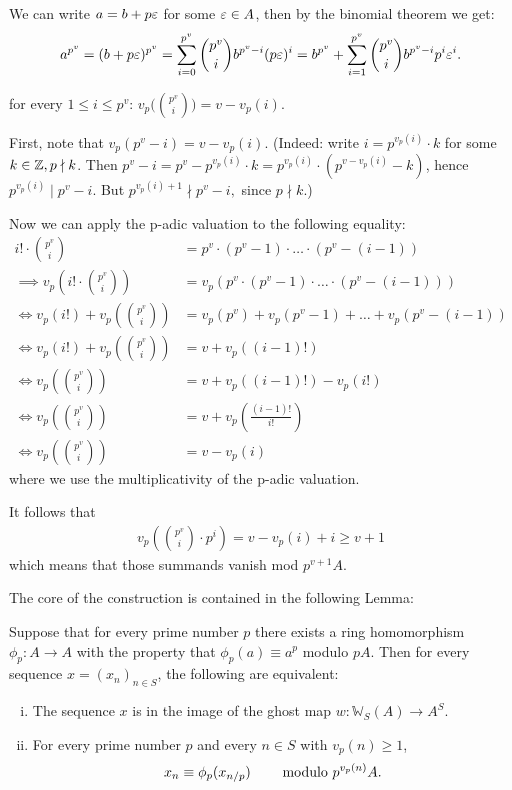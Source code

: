 \begin{bigproof}
    We can write $a = b + p \varepsilon$ for some $\varepsilon \in A$,
    then by the binomial theorem we get:
    \[
        a^{p^{v}} = (b+p\varepsilon)^{p^v} = \sum_{i=0}^{p^v} \binom{p^v}{i}b^{p^v-i}(p\varepsilon)^{i}
        = b^{p^v} + \sum_{i=1}^{p^v} \binom{p^v}{i}b^{p^v-i}p^{i}\varepsilon^{i}.
    \]
    \begin{claim*}
    for every $1 \leq i \leq p^v$: $v_p\bigl(\binom{p^v}{i}\bigr) = v - v_p(i)$.
    \end{claim*}
    \begin{smallproof}
        First, note that $v_p(p^v-i) = v - v_p(i).$
        (Indeed: write $i = p^{v_p(i)} \cdot k$ for some $k \in \mathbb{Z}, p \nmid k$.
        Then $p^v-i = p^v-p^{v_p(i)}\cdot k = p^{v_p(i)}\cdot (p^{v-v_p(i)}-k)$,
        hence $p^{v_p(i)} \mid p^v-i$. But $p^{v_p(i)+1} \nmid p^v-i,$ since $p \nmid k$.)

        Now we can apply the p-adic valuation to the following equality:
        \begin{align*}
            i! \cdot \binom{p^v}{i} &= p^v \cdot (p^v-1) \cdot \ldots \cdot (p^v-(i-1)) \\
            \implies v_p \left( i! \cdot \binom{p^v}{i} \right) &= v_p(p^v \cdot (p^v-1) \cdot \ldots \cdot (p^v-(i-1))) \\
            \iff v_p(i!)+ v_p\left(\binom{p^v}{i}\right) &= v_p(p^v) + v_p(p^v-1) + \ldots + v_p(p^v-(i-1)) \\
            \iff v_p(i!)+ v_p\left(\binom{p^v}{i}\right) &= v + v_p((i-1)!) \\
            \iff v_p\left(\binom{p^v}{i}\right) &= v + v_p((i-1)!) - v_p(i!) \\
            \iff v_p\left(\binom{p^v}{i}\right) &= v + v_p\left(\frac{(i-1)!}{i!}\right) \\
            \iff v_p\left(\binom{p^v}{i}\right) &= v - v_p(i)
        \end{align*}
        where we use the multiplicativity of the p-adic valuation.
    \end{smallproof}
        It follows that 
        \begin{align*}
            v_p\left(\binom{p^v}{i} \cdot p^{i}\right) = v - v_p(i) + i \geq v+1
        \end{align*}
        which means that those summands vanish mod $p^{v+1}A$.
\end{bigproof}
The core of the construction is contained in the following Lemma:
\begin{lemma}[Dwork]\label{lem: dwork}
Suppose that for every prime number
$p$ there exists a ring homomorphism $\phi_p \colon A \to A$ with
the property that $\phi_p(a) \equiv a^p$ modulo $pA$. Then for every
sequence $x = (x_n)_{n \in S}$, the following 
are equivalent:
\begin{enumerate}[(i)]
\item The sequence $x$ is in the image of the ghost map
$w \colon \mathbb{W}_S(A) \to A^S.$
\item For every prime number $p$ and every $n \in S$
with $v_p(n) \geqslant 1$,
$$x_n \equiv \phi_p(x_{n/p}) \hskip8mm \text{modulo $p^{v_p(n)}A$.}$$
\end{enumerate}    
\end{lemma}

